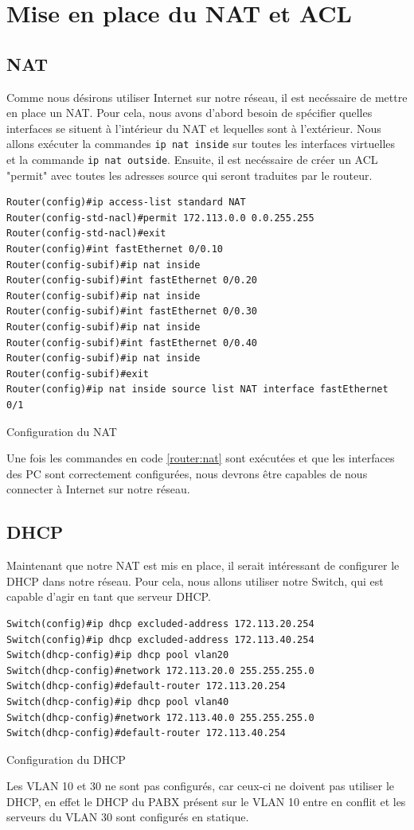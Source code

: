\documentclass{article}
\begin{document}
\section{Mise en place du NAT et ACL}
\subsection{NAT}
Comme nous désirons utiliser Internet sur notre réseau, il est necéssaire de mettre en place un NAT. Pour cela, nous avons d'abord besoin de spécifier quelles interfaces se situent à l'intérieur du NAT et lequelles sont à l'extérieur.
Nous allons exécuter la commandes \verb|ip nat inside| sur toutes les interfaces virtuelles et la commande \verb|ip nat outside|. Ensuite, il est necéssaire de créer un ACL "permit" avec toutes les adresses source qui seront traduites par le routeur.
\begin{listing}[H]
    \begin{verbatim}
Router(config)#ip access-list standard NAT
Router(config-std-nacl)#permit 172.113.0.0 0.0.255.255
Router(config-std-nacl)#exit
Router(config)#int fastEthernet 0/0.10
Router(config-subif)#ip nat inside
Router(config-subif)#int fastEthernet 0/0.20
Router(config-subif)#ip nat inside
Router(config-subif)#int fastEthernet 0/0.30
Router(config-subif)#ip nat inside
Router(config-subif)#int fastEthernet 0/0.40
Router(config-subif)#ip nat inside
Router(config-subif)#exit
Router(config)#ip nat inside source list NAT interface fastEthernet 0/1
    \end{verbatim}
    \caption{Configuration du NAT}
    \label{router:nat}
\end{listing}
Une fois les commandes en code \ref{router:nat} sont exécutées et que les interfaces des PC sont correctement configurées, nous devrons être capables de nous connecter à Internet sur notre réseau.
\subsection{DHCP}
Maintenant que notre NAT est mis en place, il serait intéressant de configurer le DHCP dans notre réseau.
Pour cela, nous allons utiliser notre Switch, qui est capable d'agir en tant que serveur DHCP.
\begin{listing}[H]
    \begin{verbatim}
Switch(config)#ip dhcp excluded-address 172.113.20.254
Switch(config)#ip dhcp excluded-address 172.113.40.254
Switch(dhcp-config)#ip dhcp pool vlan20
Switch(dhcp-config)#network 172.113.20.0 255.255.255.0
Switch(dhcp-config)#default-router 172.113.20.254
Switch(dhcp-config)#ip dhcp pool vlan40
Switch(dhcp-config)#network 172.113.40.0 255.255.255.0
Switch(dhcp-config)#default-router 172.113.40.254
    \end{verbatim}
    \caption{Configuration du DHCP}
    \label{switch:dhcp}
\end{listing}
Les VLAN 10 et 30 ne sont pas configurés, car ceux-ci ne doivent pas utiliser le DHCP, en effet le DHCP du PABX présent sur le VLAN 10 entre en conflit et les serveurs du VLAN 30 sont configurés en statique.
\end{document}
